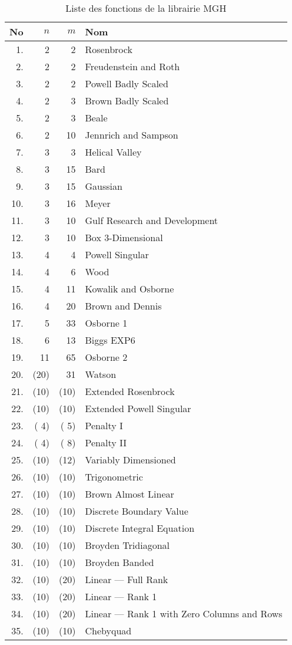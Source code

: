 {\small\center

\begin{table}[h!]
\caption{Liste des fonctions de la librairie MGH}
\center
\begin{tabular}{|r|r|r|l|}
\hline
 No & $n$ & $m$ & Nom \\
\hline
 1. &   2 &   2 &  Rosenbrock\\
 2. &   2 &   2 &  Freudenstein and Roth\\
 3. &   2 &   2 &  Powell Badly Scaled\\
 4. &   2 &   3 &  Brown Badly Scaled\\
 5. &   2 &   3 &  Beale\\
 6. &   2 &  10 &  Jennrich and Sampson\\
 7. &   3 &   3 &  Helical Valley\\
 8. &   3 &  15 &  Bard\\
 9. &   3 &  15 &  Gaussian\\
10. &   3 &  16 &  Meyer\\
11. &   3 &  10 &  Gulf Research and Development\\
12. &   3 &  10 &  Box 3-Dimensional\\
13. &   4 &   4 &  Powell Singular\\
14. &   4 &   6 &  Wood\\
15. &   4 &  11 &  Kowalik and Osborne\\
16. &   4 &  20 &  Brown and Dennis\\
17. &   5 &  33 &  Osborne 1\\
18. &   6 &  13 &  Biggs EXP6\\
19. &   11&  65 &  Osborne 2\\
20. & (20)&  31 &  Watson\\
21. & (10)& (10)&  Extended Rosenbrock\\
22. & (10)& (10)&  Extended Powell Singular\\
23. & ( 4)& ( 5)&  Penalty I\\
24. & ( 4)& ( 8)&  Penalty II\\
25. & (10)& (12)&  Variably Dimensioned\\
26. & (10)& (10)&  Trigonometric\\
27. & (10)& (10)&  Brown Almost Linear\\
28. & (10)& (10)&  Discrete Boundary Value\\
29. & (10)& (10)& Discrete Integral Equation\\
30. & (10)& (10)&  Broyden Tridiagonal\\
31. & (10)& (10)&  Broyden Banded\\
32. & (10)& (20)&  Linear --- Full Rank\\
33. & (10)& (20)&  Linear --- Rank 1\\
34. & (10)& (20)&  Linear --- Rank 1 with Zero Columns and Rows\\
35. & (10)& (10)&  Chebyquad\\
\hline
\end{tabular}
\label{tab:mgh}
\end{table}


}
